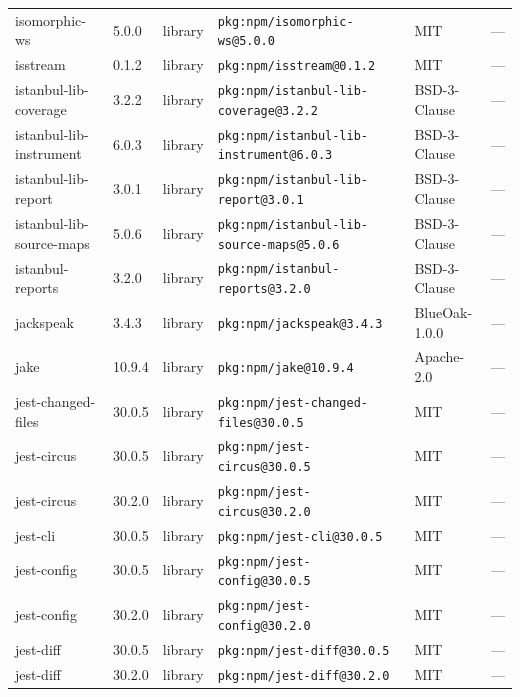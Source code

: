 \documentclass[11pt,a4paper]{article}
\begin{document}
\begin{longtable}{|p{4cm}|p{2cm}|p{1.6cm}|p{5cm}|p{1.5cm}|p{3.5cm}|}
\raggedright isomorphic-ws & 5.0.0 & library & \small\texttt{pkg:npm/isomorphic-ws@5.0.0} & MIT & \small — \\
\raggedright isstream & 0.1.2 & library & \small\texttt{pkg:npm/isstream@0.1.2} & MIT & \small — \\
\raggedright istanbul-lib-coverage & 3.2.2 & library & \small\texttt{pkg:npm/istanbul-lib-coverage@3.2.2} & BSD-3-Clause & \small — \\
\raggedright istanbul-lib-instrument & 6.0.3 & library & \small\texttt{pkg:npm/istanbul-lib-instrument@6.0.3} & BSD-3-Clause & \small — \\
\raggedright istanbul-lib-report & 3.0.1 & library & \small\texttt{pkg:npm/istanbul-lib-report@3.0.1} & BSD-3-Clause & \small — \\
\raggedright istanbul-lib-source-maps & 5.0.6 & library & \small\texttt{pkg:npm/istanbul-lib-source-maps@5.0.6} & BSD-3-Clause & \small — \\
\raggedright istanbul-reports & 3.2.0 & library & \small\texttt{pkg:npm/istanbul-reports@3.2.0} & BSD-3-Clause & \small — \\
\raggedright jackspeak & 3.4.3 & library & \small\texttt{pkg:npm/jackspeak@3.4.3} & BlueOak-1.0.0 & \small — \\
\raggedright jake & 10.9.4 & library & \small\texttt{pkg:npm/jake@10.9.4} & Apache-2.0 & \small — \\
\raggedright jest-changed-files & 30.0.5 & library & \small\texttt{pkg:npm/jest-changed-files@30.0.5} & MIT & \small — \\
\raggedright jest-circus & 30.0.5 & library & \small\texttt{pkg:npm/jest-circus@30.0.5} & MIT & \small — \\
\raggedright jest-circus & 30.2.0 & library & \small\texttt{pkg:npm/jest-circus@30.2.0} & MIT & \small — \\
\raggedright jest-cli & 30.0.5 & library & \small\texttt{pkg:npm/jest-cli@30.0.5} & MIT & \small — \\
\raggedright jest-config & 30.0.5 & library & \small\texttt{pkg:npm/jest-config@30.0.5} & MIT & \small — \\
\raggedright jest-config & 30.2.0 & library & \small\texttt{pkg:npm/jest-config@30.2.0} & MIT & \small — \\
\raggedright jest-diff & 30.0.5 & library & \small\texttt{pkg:npm/jest-diff@30.0.5} & MIT & \small — \\
\raggedright jest-diff & 30.2.0 & library & \small\texttt{pkg:npm/jest-diff@30.2.0} & MIT & \small — \\

\end{longtable}
\end{document}
